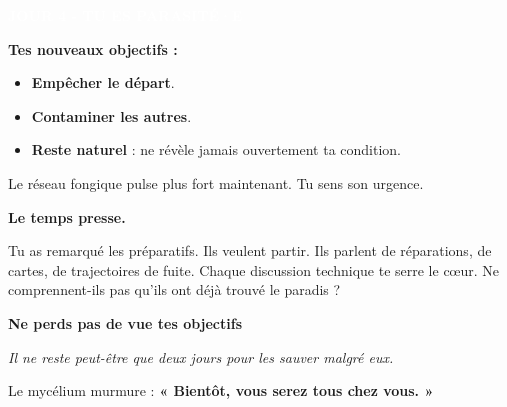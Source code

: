 \documentclass[a4paper,10pt]{article}
\newcommand{\ficheparasite}[1]{
\colorbox{parasitecolor}{\textcolor{white}{\textbf{#1}}}
}
\begin{document}
\noindent
\begin{minipage}[t]{0.48\textwidth}
\raggedright
\ficheparasite{JOUR 4 - TU ES PARASITÉ·E}

\vspace{0.3cm}

\textbf{Tes nouveaux objectifs :}

\begin{itemize}
\setlength\itemsep{0.1em}
\item \textbf{Empêcher le départ}.
\item \textbf{Contaminer les autres}.
\item \textbf{Reste naturel} : ne révèle jamais ouvertement ta condition.
\end{itemize}

\vspace{0.2cm}

Le réseau fongique pulse plus fort maintenant. Tu sens son urgence.

\vspace{0.2cm}

\textbf{Le temps presse.}

\vspace{0.2cm}

Tu as remarqué les préparatifs. Ils veulent partir. Ils parlent de réparations, de cartes, de trajectoires de fuite. Chaque discussion technique te serre le cœur. Ne comprennent-ils pas qu'ils ont déjà trouvé le paradis ?

\vspace{0.2cm}

\textbf{Ne perds pas de vue tes objectifs}

\vspace{0.2cm}

\textit{Il ne reste peut-être que deux jours pour les sauver malgré eux.}

\vspace{0.2cm}

Le mycélium murmure : \textbf{« Bientôt, vous serez tous chez vous. »}
\end{minipage}
\hfill
\end{document}
